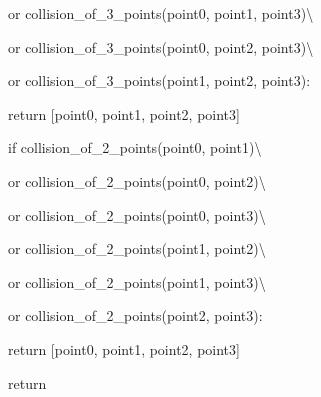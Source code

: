 \documentclass{article}
\begin{document}
{\vspace{-1.012pt}            or collision\_{}of\_{}3\_{}points\hspace{0.226pt}(point0, point1, point3)\textbackslash{}  

\vspace{-0.771pt}            or collision\_{}of\_{}3\_{}points\hspace{0.226pt}(point0, point2, point3)\textbackslash{} 

\vspace{-0.771pt}            or collision\_{}of\_{}3\_{}points\hspace{0.226pt}(point1, point2, point3): 

\vspace{-0.771pt}        return [point0, point1, point2, point3] 

\vspace{12.547pt} 

\vspace{-0.771pt}    if collision\_{}of\_{}2\_{}points\hspace{0.226pt}(point0, point1)\textbackslash{} 

\vspace{-0.771pt}            or collision\_{}of\_{}2\_{}points\hspace{0.226pt}(point0, point2)\textbackslash{} 

\vspace{-0.771pt}            or collision\_{}of\_{}2\_{}points\hspace{0.226pt}(point0, point3)\textbackslash{} 

\vspace{-0.771pt}            or collision\_{}of\_{}2\_{}points\hspace{0.226pt}(point1, point2)\textbackslash{} 

\vspace{-0.771pt}            or collision\_{}of\_{}2\_{}points\hspace{0.197pt}(point1, point3)\textbackslash{} 

\vspace{-0.741pt}            or collision\_{}of\_{}2\_{}points\hspace{0.226pt}(point2, point3): 

\vspace{-0.771pt}        return [point0, point1, point2, point3] 

\vspace{12.527pt} 

\vspace{-1.016pt}    return 


\vspace{18.308pt}{\fontsize{16.14pt}{19.368pt}\selectfont{} }}%
\end{document}

